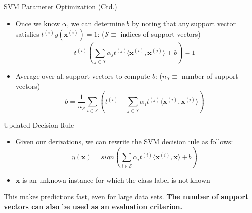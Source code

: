 \begin{frame}{SVM Parameter Optimization (Ctd.)}{}\optional
	\begin{itemize}
		\item Once we know $\bm{\alpha}$, we can determine $b$ by noting that any
			support vector satisfies $t^{(i)} y(\bm{x}^{(i)}) = 1$: {\scriptsize ($\mathcal{S} \equiv$ indices of support vectors)}
		\begin{equation}
			t^{(i)} \left( \sum_{j \in \mathcal{S}} \alpha_j t^{(j)} \langle \bm{x}^{(i)}, \bm{x}^{(j)} \rangle + b \right) = 1
		\end{equation}
		\item Average over all support vectors to compute $b$: {\scriptsize ($n_\mathcal{S} \equiv$ number of support vectors)}
		\begin{equation}
			b = \frac{1}{n_{\mathcal{S}}} \sum_{i \in \mathcal{S}} \left(
				t^{(i)} - \sum_{j \in \mathcal{S}} \alpha_j t^{(j)} \langle \bm{x}^{(i)}, \bm{x}^{(j)} \rangle
			\right)
		\end{equation}
	\end{itemize}
\end{frame}


\begin{frame}{Updated Decision Rule}{}
	\begin{itemize}
		\item Given our derivations, we can rewrite the SVM decision rule as follows:
		\begin{equation}
			y(\bm{x}) = sign\left( \sum_{i \in \mathcal{S}} \alpha_i t^{(i)} \langle \bm{x}^{(i)}, \bm{x} \rangle + b \right)
		\end{equation}
		\item $\bm{x}$ is an unknown instance for which the class label is not known
	\end{itemize}

	\begin{boxBlueNoFrame}
		\footnotesize
		 This makes predictions fast, even for large data sets.
		\textbf{The number of support vectors can also be used as an evaluation criterion.}
	\end{boxBlueNoFrame}
\end{frame}



